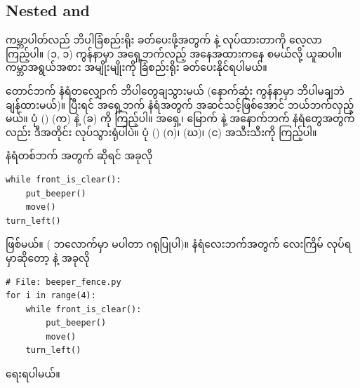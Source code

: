 \subsection*{Nested  and }
ကမ္ဘာပါတ်လည် ဘိပါခြံစည်းရိုး ခတ်ပေးဖို့အတွက်  နဲ့   လုပ်ထားတာကို လေ့လာကြည့်ပါ။ (၁, ၁) ကွန်နာမှာ အရှေ့ဘက်လည့် အနေအထားကနေ စမယ်လို့ ယူဆပါ။ ကမ္ဘာအရွယ်အစား အမျိုးမျိုးကို ခြံစည်းရိုး ခတ်ပေးနိုင်ရပါမယ်။

တောင်ဘက် နံရံတလျှောက် ဘိပါတွေချသွားမယ် (နောက်ဆုံး ကွန်နာမှာ ဘိပါမချဘဲ ချန်ထားမယ်)။ ပြီးရင် အရှေ့ဘက် နံရံအတွက် အဆင်သင့်ဖြစ်အောင် ဘယ်ဘက်လှည့်မယ်။ ပုံ (\fRefNo{\ref{fig:beeper_fence_iters}}) (က) နဲ့ (ခ) ကို ကြည့်ပါ။ အရှေ့၊ မြောက် နဲ့ အနောက်ဘက် နံရံတွေအတွက်လည်း ဒီအတိုင်း လုပ်သွားရုံပါပဲ။ ပုံ (\fRefNo{\ref{fig:beeper_fence_iters}}) (ဂ)၊ (ဃ)၊ (င) အသီးသီးကို ကြည့်ပါ။

နံရံတစ်ဘက် အတွက် ဆိုရင် အခုလို
%
\setlength{\fboxsep}{0pt}
\begin{verbatim}
while front_is_clear():
    put_beeper()
    move()
turn_left()
\end{verbatim}
%
ဖြစ်မယ်။ ( ဘလောက်မှာ   မပါတာ ဂရုပြုပါ)။ နံရံလေးဘက်အတွက် လေးကြိမ် လုပ်ရမှာဆိုတော့  နဲ့ အခုလို
%
\setlength{\fboxsep}{0pt}
\begin{verbatim}
# File: beeper_fence.py
for i in range(4):
    while front_is_clear():
        put_beeper()
        move()
    turn_left()
\end{verbatim}
%
ရေးရပါမယ်။

